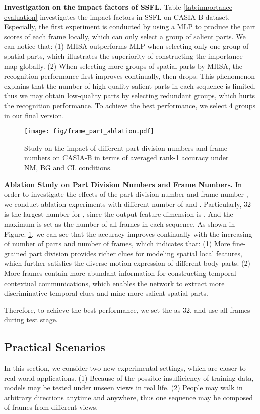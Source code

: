 \documentclass[journal]{IEEEtran}
\begin{document}
\noindent \textbf{Investigation on the impact factors of SSFL.} Table \ref{tab:importance evaluation} investigates the impact factors in SSFL on CASIA-B dataset. Especially, the first experiment is conducted by using a MLP to produce the part scores of each frame locally, which can only select a group of salient parts. We can notice that: (1) MHSA outperforms MLP when selecting only one group of spatial parts, which illustrates the superiority of constructing the importance map globally. (2) When selecting more groups of spatial parts by MHSA, the recognition performance first improves continually, then drops. This phenomenon explains that the number of high quality salient parts in each sequence is limited, thus we may obtain low-quality parts by selecting redundant groups, which hurts the recognition performance. To achieve the best performance, we select 4 groups in our final version.

\begin{figure}[ht]
    \centering
    \texttt{[image: fig/frame\_part\_ablation.pdf]}
    \caption{Study on the impact of different part division numbers and frame numbers on CASIA-B \cite{yu2006framework} in terms of averaged rank-1 accuracy under NM, BG and CL conditions.}
    \label{fig:part_analysis}
\end{figure}

\noindent \textbf{Ablation Study on Part Division Numbers and Frame Numbers.} In order to investigate the effects of the part division number  and frame number , we conduct ablation experiments with different number of  and . Particularly, 32 is the largest number for , since the output feature dimension is . And the maximum  is set as the number of all frames in each sequence. As shown in Figure. \ref{fig:part_analysis}, we can see that the accuracy improves continually with the increasing of number of parts and number of frames, which indicates that: (1) More fine-grained part division provides richer clues for modeling spatial local features, which further satisfies the diverse motion expression of different body parts. (2) More frames contain more abundant information for constructing temporal contextual communications, which enables the network to extract more discriminative temporal clues and mine more salient spatial parts.

Therefore, to achieve the best performance, we set the  as 32, and use all frames during test stage.

\subsection{Practical Scenarios}
In this section, we consider two new experimental settings, which are closer to real-world applications.  (1) Because of the possible insufficiency of training data, models may be tested under unseen views in real life. (2) People may walk in arbitrary directions anytime and anywhere, thus one sequence may be composed of frames from different views.
\end{document}
